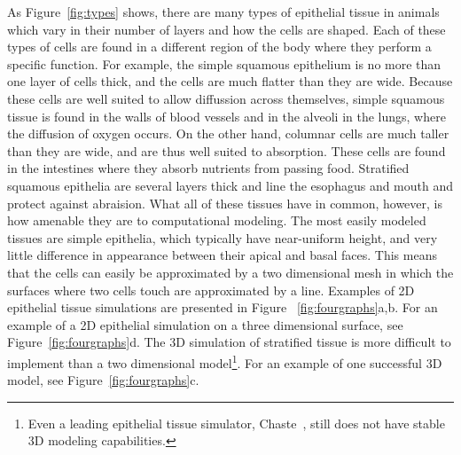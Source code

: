 As Figure~\ref{fig:types} shows, there are many types of epithelial tissue in animals which vary in their number of layers and how the cells are shaped. Each of these types of cells are found in a different region of the body where they perform a specific function.  For example, the simple squamous epithelium is no more than one layer of cells thick, and the cells are much flatter than they are wide. Because these cells are well suited to allow diffussion across themselves, simple squamous tissue is found in the walls of blood vessels and in the alveoli in the lungs, where the diffusion of oxygen occurs. On the other hand, columnar cells are much taller than they are wide, and are thus well suited to absorption. These cells are found in the intestines where they absorb nutrients from passing food. Stratified squamous epithelia are several layers thick and line the esophagus and mouth and protect against abraision.
What all of these tissues have in common, however, is how amenable they are to computational modeling. The most easily modeled tissues are simple epithelia, which typically have near-uniform height, and very little difference in appearance between their apical and basal faces. This means that the cells can easily be approximated by a two dimensional mesh in which the surfaces where two cells touch are approximated by a line. Examples of 2D epithelial tissue simulations are presented in Figure ~\ref{fig:fourgraphs}a,b. For an example of a 2D epithelial simulation on a three dimensional surface, see Figure~\ref{fig:fourgraphs}d. The 3D simulation of stratified tissue is more difficult to implement than a two dimensional model\footnote{Even a leading epithelial tissue simulator, Chaste~\cite{ChasteMain}, still does not have stable 3D modeling capabilities.}. For an example of one successful 3D model, see Figure~\ref{fig:fourgraphs}c.

